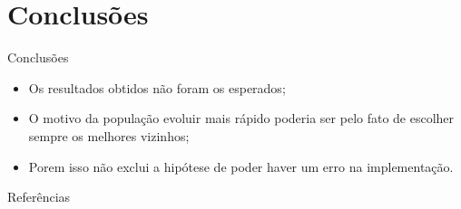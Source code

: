 \documentclass{beamer}
\begin{document}
\section{Conclusões}
\begin{frame}{Conclusões}
	\begin{itemize}
		\item Os resultados obtidos não foram os esperados;
		\item O motivo da população evoluir mais rápido poderia ser pelo fato
		de escolher sempre os melhores vizinhos;
		\item Porem isso não exclui a hipótese de poder haver um erro na
		implementação.
	\end{itemize}
\end{frame}


\begin{frame}{Referências}


\end{frame}

\begin{frame}
\maketitle
\end{frame}
\end{document}
